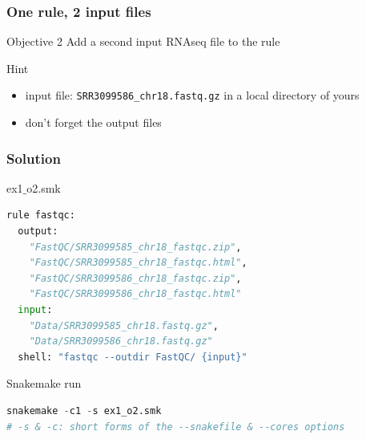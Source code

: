 \begin{frame}[containsverbatim]
\frametitle{One rule, 2 input files}
\begin{exampleblock}{Objective 2}
Add a second input RNAseq file to the rule
\end{exampleblock}
\begin{exampleblock}{Hint}
\begin{itemize}
    \item input file: \verb|SRR3099586_chr18.fastq.gz| in a local directory of yours
    \item don't forget the output files
\end{itemize}
\end{exampleblock}
\end{frame}
\begin{frame}[containsverbatim]
\frametitle{Solution}
\begin{exampleblock}{ex1$\_$o2.smk}
\begin{lstlisting}[language=python]
rule fastqc:
  output:
    "FastQC/SRR3099585_chr18_fastqc.zip", 
    "FastQC/SRR3099585_chr18_fastqc.html",
    "FastQC/SRR3099586_chr18_fastqc.zip", 
    "FastQC/SRR3099586_chr18_fastqc.html"
  input:
    "Data/SRR3099585_chr18.fastq.gz",
    "Data/SRR3099586_chr18.fastq.gz"
  shell: "fastqc --outdir FastQC/ {input}"
\end{lstlisting}
\end{exampleblock}
\begin{exampleblock}{Snakemake run}
\begin{lstlisting}[language=python]
snakemake -c1 -s ex1_o2.smk
# -s & -c: short forms of the --snakefile & --cores options
\end{lstlisting}
\end{exampleblock}
\end{frame}
